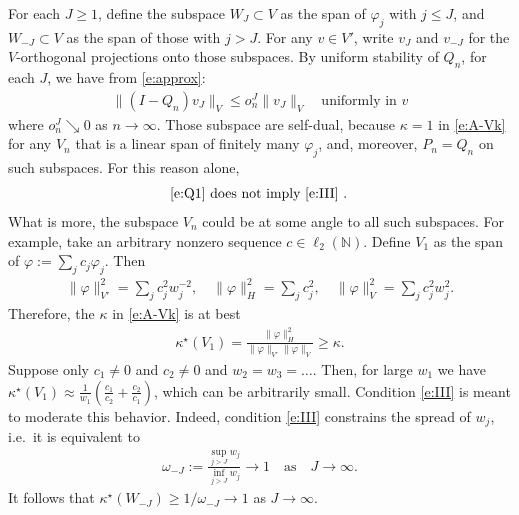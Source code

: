\documentclass[12pt]{article}
\newcommand{\IN}{\mathbb{N}}
\newcommand{\norm}[2]{\|#1\|_{#2}}
\begin{document}
	For each $J \geq 1$,
	define the subspace $W_J \subset V$ as the span of 
	$\varphi_j$ with $j \leq J$,
	and
	$W_{-J} \subset V$ as the span of those with $j > J$.
	For any $v \in V'$, write $v_J$ and $v_{-J}$
	for the $V$-orthogonal projections onto those subspaces.
	By uniform stability of $Q_n$, 
	for each $J$,
	we have from \eqref{e:approx}:
	\begin{align}
		\label{e:QJ}
		\norm{(I - Q_n) v_J}{V}
		\leq
		o_n^J
		\norm{v_J}{V}
		\quad
		\text{uniformly in $v$}
	\end{align}
	where $o_n^J \searrow 0$ as $n \to \infty$.
	Those subspace are self-dual, 
	because
	$\kappa = 1$ in \eqref{e:A-Vk}
	for 
	any $V_n$ that is a linear span 
	of finitely many $\varphi_j$,
	and, moreover, $P_n = Q_n$ on such subspaces.
	For this reason alone, 
	\begin{align}
		\text{
			\eqref{e:Q1}
			does not imply
			\eqref{e:III}
			.
		}
	\end{align}
	What is more, the subspace $V_n$
	could be at some angle to all such subspaces.
	For example, take an arbitrary nonzero sequence $c \in \ell_2(\IN)$.
	Define $V_1$ as the span of $\varphi := \sum_j c_j \varphi_j$.
	Then
	\begin{align}
		\textstyle
		\norm{\varphi}{V'}^2
		=
		\sum_j c_j^2 w_j^{-2}
		,
		\quad
		\norm{\varphi}{H}^2
		=
		\sum_j c_j^2
		,
		\quad
		\norm{\varphi}{V}^2
		=
		\sum_j c_j^2 w_j^2
		.
	\end{align}
	Therefore, the $\kappa$ in \eqref{e:A-Vk}
	is at best
	\begin{align}
		\kappa^\star
		(V_1)
		=
		\frac{
			\norm{\varphi}{H}^2
		}{
			\norm{\varphi}{V'}
			\norm{\varphi}{V}
		}
		\geq \kappa
		.
	\end{align}
	Suppose only $c_1 \neq 0$ and $c_2 \neq 0$
	and
	$w_2 = w_3 = \ldots$.
	Then, for large $w_1$ we have 
	$
		\kappa^\star(V_1) \approx \frac{1}{w_1}(\frac{c_1}{c_2} + \frac{c_2}{c_1})
	$,
	which can be arbitrarily small.
	Condition \eqref{e:III}
	is meant to moderate this behavior.
	Indeed, 
	condition \eqref{e:III} 
	constrains the spread of $w_j$,
	i.e.~it is equivalent to
	\begin{align}
		\label{e:spread}
		\omega_{-J}
		:=
		\frac{
			\sup_{j > J} w_j
		}{
			\inf_{j > J} w_j
		}
		\to 1
		\quad\text{as}\quad 
		J \to \infty
		.
	\end{align}
	It follows that
	$
		\kappa^\star(W_{-J}) \geq 1 / \omega_{-J}
		\to 1
	$
	as
	$J \to \infty$.
	
\end{document}
